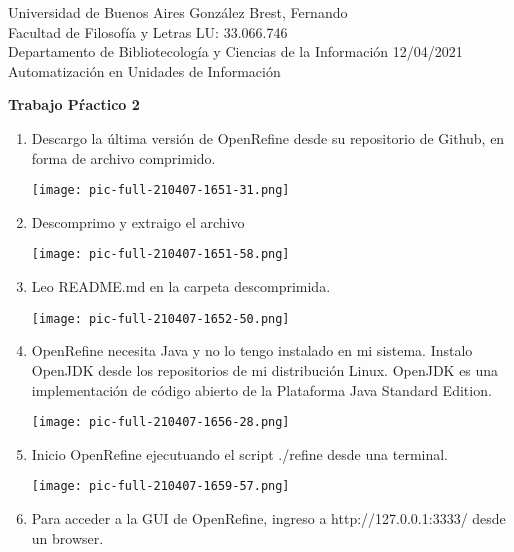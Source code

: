 \documentclass{article}
\begin{document}
\begin{flushleft}
	Universidad de Buenos Aires \hfill González Brest, Fernando\\ Facultad de Filosofía y Letras \hfill LU: 33.066.746\\ Departamento de Bibliotecología y Ciencias de la Información \hfill 12/04/2021\\ Automatización en Unidades de Información
\end{flushleft}

\begin{center}\vspace{0.5cm}
\textbf{ \LARGE Trabajo Pŕactico 2}
\end{center}
\begin{enumerate}
	\item{Descargo la última versión de OpenRefine desde su repositorio de Github, en forma de archivo comprimido.}
		\begin{center}
			\texttt{[image: pic-full-210407-1651-31.png]}
		\end{center}
	\item{Descomprimo y extraigo el archivo}
		\begin{center}
			\texttt{[image: pic-full-210407-1651-58.png]}
		\end{center}
\newpage
	\item{Leo README.md en la carpeta descomprimida.}
		\begin{center}
			\texttt{[image: pic-full-210407-1652-50.png]}
		\end{center}
	\item{OpenRefine necesita Java y no lo tengo instalado en mi sistema. Instalo OpenJDK desde los repositorios de mi distribución Linux. OpenJDK es una implementación de código abierto de la Plataforma Java Standard Edition.}
		\begin{center}
			\texttt{[image: pic-full-210407-1656-28.png]}
		\end{center}
\newpage
	\item{Inicio OpenRefine ejecutuando el script ./refine desde una terminal.}
		\begin{center}
			\texttt{[image: pic-full-210407-1659-57.png]}
		\end{center}
	\item{Para acceder a la GUI de OpenRefine, ingreso a http://127.0.0.1:3333/ desde un browser.}
		\begin{center}

\end{center}
\end{enumerate}
\end{document}
